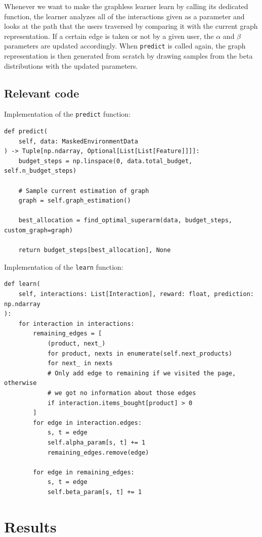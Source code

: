 Whenever we want to make the graphless learner learn by calling its dedicated function, the learner analyzes all of the interactions given as a parameter and looks at the path that the users traversed by comparing it with the current graph representation.
If a certain edge is taken or not by a given user, the $\alpha$ and $\beta$ parameters are updated accordingly.
When \texttt{predict} is called again, the graph representation is then generated from scratch by drawing samples from the beta distributions with the updated parameters.

\subsection{Relevant code}

Implementation of the \texttt{predict} function:

\begin{lstlisting}[style=Python]
def predict(
	self, data: MaskedEnvironmentData
) -> Tuple[np.ndarray, Optional[List[List[Feature]]]]:
	budget_steps = np.linspace(0, data.total_budget, self.n_budget_steps)

	# Sample current estimation of graph
	graph = self.graph_estimation()

	best_allocation = find_optimal_superarm(data, budget_steps, custom_graph=graph)

	return budget_steps[best_allocation], None\end{lstlisting}

Implementation of the \texttt{learn} function:

\begin{lstlisting}[style=Python]
def learn(
	self, interactions: List[Interaction], reward: float, prediction: np.ndarray
):
	for interaction in interactions:
		remaining_edges = [
			(product, next_)
			for product, nexts in enumerate(self.next_products)
			for next_ in nexts
			# Only add edge to remaining if we visited the page, otherwise
			# we got no information about those edges
			if interaction.items_bought[product] > 0
		]
		for edge in interaction.edges:
			s, t = edge
			self.alpha_param[s, t] += 1
			remaining_edges.remove(edge)

		for edge in remaining_edges:
			s, t = edge
			self.beta_param[s, t] += 1
\end{lstlisting}

\section{Results}
\label{sec:unc_w_res}

